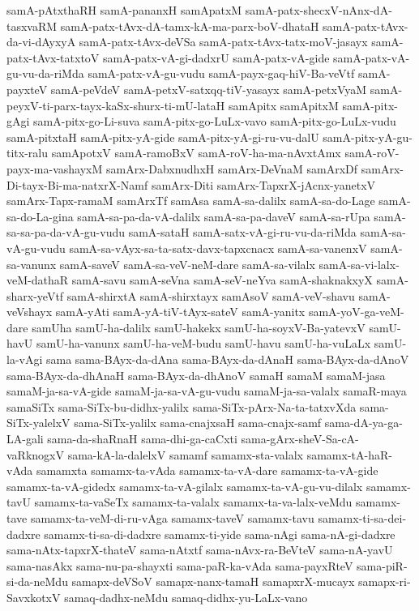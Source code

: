 {samA-pAtxthaRH
samA-pananxH
samApatxM
samA-patx-shecxV-nAnx-dA-tasxvaRM
samA-patx-tAvx-dA-tamx-kA-ma-parx-boV-dhataH
samA-patx-tAvx-da-vi-dAyxyA
samA-patx-tAvx-deVSa
samA-patx-tAvx-tatx-moV-jasayx
samA-patx-tAvx-tatxtoV
samA-patx-vA-gi-dadxrU
samA-patx-vA-gide
samA-patx-vA-gu-vu-da-riMda
samA-patx-vA-gu-vudu
samA-payx-gaq-hiV-Ba-veVtf
samA-payxteV
samA-peVdeV
samA-petxV-satxqq-tiV-yasayx
samA-petxVyaM
samA-peyxV-ti-parx-tayx-kaSx-shurx-ti-mU-lataH
samApitx
samApitxM
samA-pitx-gAgi
samA-pitx-go-Li-suva
samA-pitx-go-LuLx-vavo
samA-pitx-go-LuLx-vudu
samA-pitxtaH
samA-pitx-yA-gide
samA-pitx-yA-gi-ru-vu-dalU
samA-pitx-yA-gu-titx-ralu
samApotxV
samA-ramoBxV
samA-roV-ha-ma-nAvxtAmx
samA-roV-payx-ma-vashayxM
samArx-DabxnudhxH
samArx-DeVnaM
samArxDf
samArx-Di-tayx-Bi-ma-natxrX-Namf
samArx-Diti
samArx-TapxrX-jAcnx-yanetxV
samArx-Tapx-ramaM
samArxTf
samAsa
samA-sa-dalilx
samA-sa-do-Lage
samA-sa-do-La-gina
samA-sa-pa-da-vA-dalilx
samA-sa-pa-daveV
samA-sa-rUpa
samA-sa-sa-pa-da-vA-gu-vudu
samA-sataH
samA-satx-vA-gi-ru-vu-da-riMda
samA-sa-vA-gu-vudu
samA-sa-vAyx-sa-ta-satx-davx-tapxcnacx
samA-sa-vanenxV
samA-sa-vanunx
samA-saveV
samA-sa-veV-neM-dare
samA-sa-vilalx
samA-sa-vi-lalx-veM-dathaR
samA-savu
samA-seVna
samA-seV-neYva
samA-shaknakxyX
samA-sharx-yeVtf
samA-shirxtA
samA-shirxtayx
samAsoV
samA-veV-shavu
samA-veVshayx
samA-yAti
samA-yA-tiV-tAyx-sateV
samA-yanitx
samA-yoV-ga-veM-dare
samUha
samU-ha-dalilx
samU-hakekx
samU-ha-soyxV-Ba-yatevxV
samU-havU
samU-ha-vanunx
samU-ha-veM-budu
samU-havu
samU-ha-vuLaLx
samU-la-vAgi
sama
sama-BAyx-da-dAna
sama-BAyx-da-dAnaH
sama-BAyx-da-dAnoV
sama-BAyx-da-dhAnaH
sama-BAyx-da-dhAnoV
samaH
samaM
samaM-jasa
samaM-ja-sa-vA-gide
samaM-ja-sa-vA-gu-vudu
samaM-ja-sa-valalx
samaR-maya
samaSiTx
sama-SiTx-bu-didhx-yalilx
sama-SiTx-pArx-Na-ta-tatxvXda
sama-SiTx-yalelxV
sama-SiTx-yalilx
sama-cnajxsaH
sama-cnajx-samf
sama-dA-ya-ga-LA-gali
sama-da-shaRnaH
sama-dhi-ga-caCxti
sama-gArx-sheV-Sa-cA-vaRknogxV
sama-kA-la-dalelxV
samamf
samamx-sta-valalx
samamx-tA-haR-vAda
samamxta
samamx-ta-vAda
samamx-ta-vA-dare
samamx-ta-vA-gide
samamx-ta-vA-gidedx
samamx-ta-vA-gilalx
samamx-ta-vA-gu-vu-dilalx
samamx-tavU
samamx-ta-vaSeTx
samamx-ta-valalx
samamx-ta-va-lalx-veMdu
samamx-tave
samamx-ta-veM-di-ru-vAga
samamx-taveV
samamx-tavu
samamx-ti-sa-dei-dadxre
samamx-ti-sa-di-dadxre
samamx-ti-yide
sama-nAgi
sama-nA-gi-dadxre
sama-nAtx-tapxrX-thateV
sama-nAtxtf
sama-nAvx-ra-BeVteV
sama-nA-yavU
sama-nasAkx
sama-nu-pa-shayxti
sama-paR-ka-vAda
sama-payxRteV
sama-piR-si-da-neMdu
samapx-deVSoV
samapx-nanx-tamaH
samapxrX-mucayx
samapx-ri-SavxkotxV
samaq-dadhx-neMdu
samaq-didhx-yu-LaLx-vano
}
